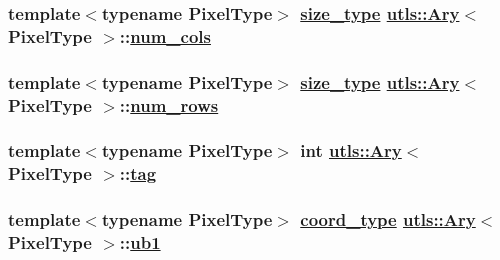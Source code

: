 \hypertarget{structutls_1_1Ary_98c4da3759918633b2030ae2cbad3939}{
\subsubsection[num\_\-cols]{\setlength{\rightskip}{0pt plus 5cm}template$<$typename Pixel\-Type$>$ \hyperlink{structutls_1_1Ary_8811de4f35f83e989511aaddf003376c}{size\_\-type} \hyperlink{structutls_1_1Ary}{utls::Ary}$<$ Pixel\-Type $>$::\hyperlink{structutls_1_1Ary_98c4da3759918633b2030ae2cbad3939}{num\_\-cols}}}
\label{structutls_1_1Ary_98c4da3759918633b2030ae2cbad3939}


\hypertarget{structutls_1_1Ary_cf02710b9f8fc2b8b17f0c49e1590256}{
\subsubsection[num\_\-rows]{\setlength{\rightskip}{0pt plus 5cm}template$<$typename Pixel\-Type$>$ \hyperlink{structutls_1_1Ary_8811de4f35f83e989511aaddf003376c}{size\_\-type} \hyperlink{structutls_1_1Ary}{utls::Ary}$<$ Pixel\-Type $>$::\hyperlink{structutls_1_1Ary_cf02710b9f8fc2b8b17f0c49e1590256}{num\_\-rows}}}
\label{structutls_1_1Ary_cf02710b9f8fc2b8b17f0c49e1590256}


\hypertarget{structutls_1_1Ary_0b9cc006bf82036676e2bfa0d7cc2b9e}{
\subsubsection[tag]{\setlength{\rightskip}{0pt plus 5cm}template$<$typename Pixel\-Type$>$ int \hyperlink{structutls_1_1Ary}{utls::Ary}$<$ Pixel\-Type $>$::\hyperlink{structutls_1_1Ary_0b9cc006bf82036676e2bfa0d7cc2b9e}{tag}}}
\label{structutls_1_1Ary_0b9cc006bf82036676e2bfa0d7cc2b9e}


\hypertarget{structutls_1_1Ary_8c54df43b278c0d681f840b8af05b12c}{
\subsubsection[ub1]{\setlength{\rightskip}{0pt plus 5cm}template$<$typename Pixel\-Type$>$ \hyperlink{structutls_1_1Ary_907420b899d180bd0ae87c3995316f18}{coord\_\-type} \hyperlink{structutls_1_1Ary}{utls::Ary}$<$ Pixel\-Type $>$::\hyperlink{structutls_1_1Ary_8c54df43b278c0d681f840b8af05b12c}{ub1}}}
\label{structutls_1_1Ary_8c54df43b278c0d681f840b8af05b12c}



